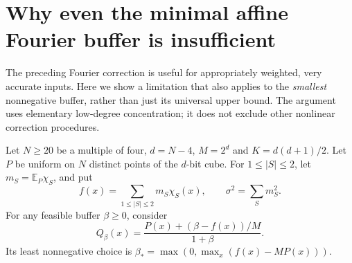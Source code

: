 \section{Why even the minimal affine Fourier buffer is insufficient}
\label{s32:sec:minimal-buffer-obstruction}
The preceding Fourier correction is useful for appropriately weighted,
very accurate inputs. Here we show a limitation that also applies to
the \emph{smallest} nonnegative buffer, rather than just its universal
upper bound. The argument uses elementary low-degree concentration;
it does not exclude other nonlinear correction procedures.

Let $N\ge20$ be a multiple of four, $d=N-4$, $M=2^d$ and
$K=d(d+1)/2$. Let $P$ be uniform on $N$ distinct points of the
$d$-bit cube. For $1\le|S|\le2$, let
$m_S=\mathbb E_P\chi_S$, and put
\[
 f(x)=\sum_{1\le|S|\le2}m_S\chi_S(x),\qquad
 \sigma^2=\sum_Sm_S^2.
\]
For any feasible buffer $\beta\ge0$, consider
\[
 Q_\beta(x)=\frac{P(x)+(\beta-f(x))/M}{1+\beta}.
\]
Its least nonnegative choice is
$\beta_* =\max(0,\max_x(f(x)-MP(x)))$.

